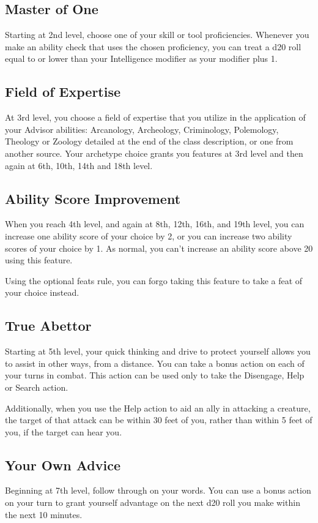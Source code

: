 \documentclass[letterpaper,openany,twoside,twocolumn]{book}
\begin{document}
	\subsection*{Master of One}
	Starting at 2nd level, choose one of your skill or tool proficiencies. Whenever you make an ability check that uses the chosen proficiency, you can treat a d20 roll equal to or lower than your Intelligence modifier as your modifier plus 1.
	
	\subsection*{Field of Expertise}
	At 3rd level, you choose a field of expertise that you utilize in the application of your Advisor abilities: Arcanology, Archeology, Criminology, Polemology, Theology or Zoology detailed at the end of the class description, or one from another source. Your archetype choice grants you features at 3rd level and then again at 6th, 10th, 14th and 18th level.
	
	\subsection*{Ability Score Improvement}
	When you reach 4th level, and again at 8th, 12th, 16th, and 19th level, you can increase one ability score of your choice by 2, or you can increase two ability scores of your choice by 1. As normal, you can’t increase an ability score above 20 using this feature.
	
	Using the optional feats rule, you can forgo taking this feature to take a feat of your choice instead.
	
	\subsection*{True Abettor}
	Starting at 5th level, your quick thinking and drive to protect yourself allows you to assist in other ways, from a distance. You can take a bonus action on each of your turns in combat. This action can be used only to take the Disengage, Help or Search action.
	
	Additionally, when you use the Help action to aid an ally in attacking a creature, the target of that attack can be within 30 feet of you, rather than within 5 feet of you, if the target can hear you.
	
	\subsection*{Your Own Advice}
	Beginning at 7th level, follow through on your words. You can use a bonus action on your turn to grant yourself advantage on the next d20 roll you make within the next 10 minutes.
	
\end{document}
